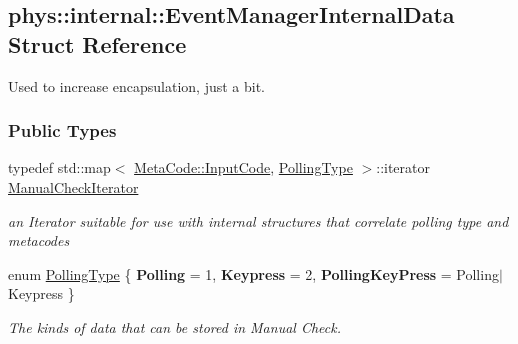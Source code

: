 \hypertarget{structphys_1_1internal_1_1EventManagerInternalData}{
\subsection{phys::internal::EventManagerInternalData Struct Reference}
\label{structphys_1_1internal_1_1EventManagerInternalData}
}


Used to increase encapsulation, just a bit.  


\subsubsection*{Public Types}
\begin{DoxyCompactItemize}
\item 
\hypertarget{structphys_1_1internal_1_1EventManagerInternalData_ad2b9c7924f32e299846f1d945cb82dc0}{
typedef std::map$<$ \hyperlink{classphys_1_1MetaCode_a3e501cbb5bf0f6f1fdb7211465bda8d8}{MetaCode::InputCode}, \hyperlink{structphys_1_1internal_1_1EventManagerInternalData_ab9ab8380b84448aacf46a63050e159af}{PollingType} $>$::iterator \hyperlink{structphys_1_1internal_1_1EventManagerInternalData_ad2b9c7924f32e299846f1d945cb82dc0}{ManualCheckIterator}}
\label{structphys_1_1internal_1_1EventManagerInternalData_ad2b9c7924f32e299846f1d945cb82dc0}

\begin{DoxyCompactList}\small\item\em an Iterator suitable for use with internal structures that correlate polling type and metacodes \item\end{DoxyCompactList}\item 
enum \hyperlink{structphys_1_1internal_1_1EventManagerInternalData_ab9ab8380b84448aacf46a63050e159af}{PollingType} \{ {\bfseries Polling} = 1, 
{\bfseries Keypress} = 2, 
{\bfseries PollingKeyPress} =  Polling$|$Keypress
 \}
\begin{DoxyCompactList}\small\item\em The kinds of data that can be stored in Manual Check. \item\end{DoxyCompactList}\end{DoxyCompactItemize}
